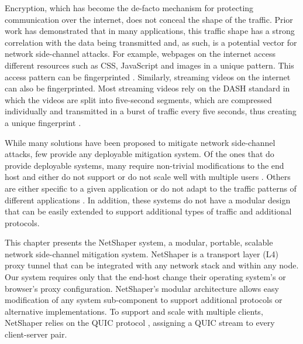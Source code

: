 
Encryption, which has become the de-facto mechanism for protecting communication over the internet, does not conceal the shape of the traffic.
Prior work has demonstrated that in many applications, this traffic shape has a strong correlation with the data being transmitted and, as such, is a potential vector for network side-channel attacks.
For example, webpages on the internet access different resources such as CSS, JavaScript and images in a unique pattern.
This access pattern can be fingerprinted \cite{gong2010fingerprinting, bhat2019varcnn, wang2014supersequence}.
Similarly, streaming videos on the internet can also be fingerprinted.
Most streaming videos rely on the DASH standard \cite{dash2013} in which the videos are split into five-second segments, which are compressed individually and transmitted in a burst of traffic every five seconds, thus creating a unique fingerprint \cite{schuster2017beautyburst}.


While many solutions have been proposed to mitigate network side-channel attacks, few provide any deployable mitigation system.
Of the ones that do provide deployable systems, many require non-trivial modifications to the end host and either do not support or do not scale well with multiple users \cite{cai2014csbuflo, cherubin2017llama, luo2011httpos, smith2022qcsd, wang2017walkie, mehta2022pacer}.
Others are either specific to a given application or do not adapt to the traffic patterns of different applications \cite{barradas2017deltashaper, cherubin2017llama, luo2011httpos}.
In addition, these systems do not have a modular design that can be easily extended to support additional types of traffic and additional protocols.

This chapter presents the NetShaper system, a modular, portable, scalable network side-channel mitigation system.
NetShaper is a transport layer (L4) proxy tunnel that can be integrated with any network stack and within any node.
Our system requires only that the end-host change their operating system's or browser's proxy configuration.
NetShaper's modular architecture allows easy modification of any system sub-component to support additional protocols or alternative implementations.
To support and scale with multiple clients, NetShaper relies on the QUIC protocol \cite{quic_rfc}, assigning a QUIC stream to every client-server pair.


